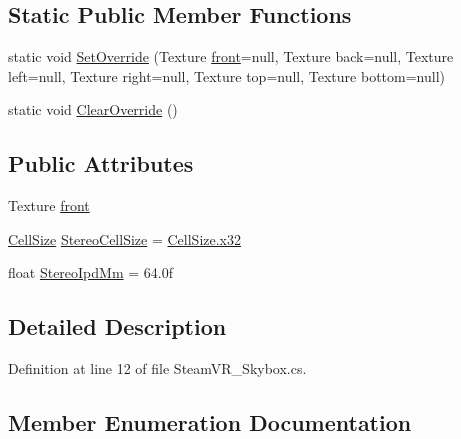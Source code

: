 \subsection*{Static Public Member Functions}
\begin{DoxyCompactItemize}
\item 
static void \mbox{\hyperlink{class_valve_1_1_v_r_1_1_steam_v_r___skybox_aa5c43e8868825c66751bb3b68c04cbca}{Set\+Override}} (Texture \mbox{\hyperlink{class_valve_1_1_v_r_1_1_steam_v_r___skybox_aca0f063275555a2eef7d3a13c9d2ca25}{front}}=null, Texture back=null, Texture left=null, Texture right=null, Texture top=null, Texture bottom=null)
\item 
static void \mbox{\hyperlink{class_valve_1_1_v_r_1_1_steam_v_r___skybox_af2326152206cf107c0fd164d5856146b}{Clear\+Override}} ()
\end{DoxyCompactItemize}
\subsection*{Public Attributes}
\begin{DoxyCompactItemize}
\item 
Texture \mbox{\hyperlink{class_valve_1_1_v_r_1_1_steam_v_r___skybox_aca0f063275555a2eef7d3a13c9d2ca25}{front}}
\item 
\mbox{\hyperlink{class_valve_1_1_v_r_1_1_steam_v_r___skybox_ad000cf5b884042065bb7e3bc5bdba27a}{Cell\+Size}} \mbox{\hyperlink{class_valve_1_1_v_r_1_1_steam_v_r___skybox_a0b108f931f6c17f472522ff230321874}{Stereo\+Cell\+Size}} = \mbox{\hyperlink{class_valve_1_1_v_r_1_1_steam_v_r___skybox_ad000cf5b884042065bb7e3bc5bdba27aa4f3143a9df778e1295ff581a6e7f1c1b}{Cell\+Size.\+x32}}
\item 
float \mbox{\hyperlink{class_valve_1_1_v_r_1_1_steam_v_r___skybox_abf622e00d773692fb0d1213d95b3ad8c}{Stereo\+Ipd\+Mm}} = 64.\+0f
\end{DoxyCompactItemize}


\subsection{Detailed Description}


Definition at line 12 of file Steam\+V\+R\+\_\+\+Skybox.\+cs.



\subsection{Member Enumeration Documentation}
\mbox{\label{class_valve_1_1_v_r_1_1_steam_v_r___skybox_ad000cf5b884042065bb7e3bc5bdba27a}} 
